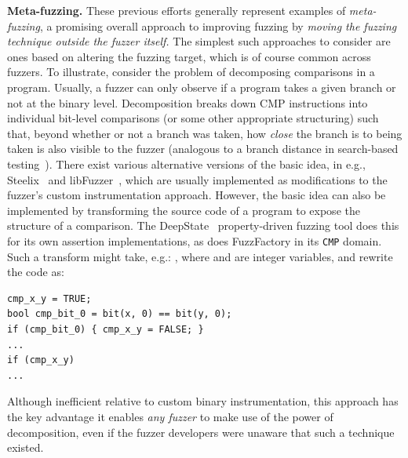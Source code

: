 \vspace{1ex}
\noindent\textbf{Meta-fuzzing.}
These previous efforts generally represent examples of 
\emph{meta-fuzzing}, a promising overall approach to improving fuzzing by 
\emph{moving the fuzzing technique outside the fuzzer itself.}  The simplest 
such approaches to consider are ones based on altering the fuzzing target, 
which is of course common across fuzzers. To illustrate, consider
the problem of decomposing comparisons in a program.  Usually, a fuzzer can only observe if a 
program takes a given branch or not at the binary level.  Decomposition breaks 
down CMP instructions into individual bit-level comparisons (or some other 
appropriate structuring) such that, beyond whether or not a branch was taken,
how \emph{close} the branch is to being taken is also visible to the fuzzer  (analogous to a branch 
distance in search-based testing~\cite{mcminn2004search}).  There exist various alternative versions of 
the basic idea, in e.g., Steelix~\cite{Steelix} and
libFuzzer~\cite{libFuzzer}, which are usually implemented 
as modifications to the fuzzer's custom instrumentation approach.  However, the basic 
idea can also be implemented by transforming the source code of a program to 
expose the structure of a comparison.  The DeepState~\cite{DeepState} property-driven fuzzing 
tool does this for its own assertion implementations, as does FuzzFactory in 
its \texttt{CMP} domain.  Such a transform might take, e.g.: , where  and  are integer variables, and rewrite the code 
as:

\begin{lstlisting}
cmp_x_y = TRUE;
bool cmp_bit_0 = bit(x, 0) == bit(y, 0);
if (cmp_bit_0) { cmp_x_y = FALSE; }
...
if (cmp_x_y)
...
\end{lstlisting}


\noindent Although inefficient relative to custom binary instrumentation, this
approach has the key advantage it enables \emph{any fuzzer} to make use of the power of 
decomposition, even if the fuzzer developers were unaware that such a technique 
existed. 

